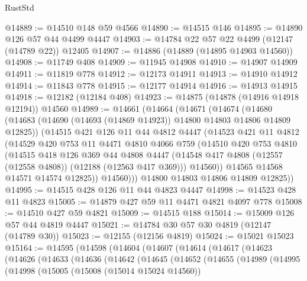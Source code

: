 \begin{lexlean}{RustStd}
\begin{coremodule}
@14889 := @14510 @148 @59 @4566
@14890 := @14515 @146
@14895 := @14890 @126 @57 @44 @4499 @4447
@14903 := @14784 @22 @57 @22 @4499 (@12147 (@14789 @22)) @12405
@14907 := @14886 (@14889 (@14895 @14903 @14560))
@14908 := @11749 @408
@14909 := @11945 @14908
@14910 := @14907 @14909
@14911 := @11819 @778
@14912 := @12173 @14911
@14913 := @14910 @14912
@14914 := @11843 @778
@14915 := @12177 @14914
@14916 := @14913 @14915
@14918 := @12182 (@12184 @408)
@14923 := @14875 (@14878 (@14916 @14918 @12194)) @14560
@14989 := @14661
    (@14664
      (@14671
        (@14674
          (@14680
            (@14683 (@14690 (@14693 (@14869 @14923)) @14800 @14803 @14806 @14809 @12825))
            (@14515
              @421
              @126
              @11
              @44
              @4812
              @4447
              (@14523
                @421
                @11
                @4812
                (@14529
                  @420
                  @753
                  @11
                  @4471
                  @4810
                  @4066
                  @759
                  (@14510
                    @420
                    @753
                    @4810
                    (@14515
                      @418
                      @126
                      @369
                      @44
                      @4808
                      @4447
                      (@14548 @417 @4808 (@12557 (@12558 @4808)) (@12188 (@12563 @417 @369)))
                      @14560))
                  @14565
                  @14568
                  @14571
                  @14574
                  @12825))
              @14560)))
        @14800
        @14803
        @14806
        @14809
        @12825))
@14995 := @14515 @428 @126 @11 @44 @4823 @4447
@14998 := @14523 @428 @11 @4823
@15005 := @14879 @427 @59 @11 @4471 @4821 @4097 @778
@15008 := @14510 @427 @59 @4821
@15009 := @14515 @188
@15014 := @15009 @126 @57 @44 @4819 @4447
@15021 := @14784 @30 @57 @30 @4819 (@12147 (@14789 @30))
@15023 := @12155 (@12156 @4819)
@15024 := @15021 @15023
@15164 := @14595
    (@14598
      (@14604
        (@14607
          (@14614
            (@14617
              (@14623
                (@14626
                  (@14633
                    (@14636
                      (@14642
                        (@14645
                          (@14652
                            (@14655
                              (@14989
                                (@14995
                                  (@14998
                                    (@15005
                                      (@15008 (@15014 @15024 @14560))

\end{coremodule}
\end{lexlean}
